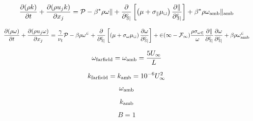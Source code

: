 

\begin{equation}
\frac{\partial (\rho k)}{\partial t} + \frac{\partial (\rho u_j k)}{\partial x_j}
  = \cal P - \beta^* \rho \omega k  + \frac{\partial}{\partial x_j}
  \left[\left(\mu + \sigma_k \mu_t \right)\frac{\partial k}{\partial x_j}\right]
  +\beta^* \rho \omega_{\rm amb} k_{\rm amb}
\end{equation}

\begin{equation}
\frac{\partial (\rho \omega)}{\partial t} + \frac{\partial (\rho u_j \omega)}{\partial x_j}
  = \frac{\gamma}{\nu_t} \cal P -
  \beta \rho \omega^2 + \frac{\partial}{\partial x_j}
  \left[ \left( \mu + \sigma_{\omega} \mu_t \right)
  \frac{\partial \omega}{\partial x_j} \right] +
  2(1-F_1) \frac{\rho \sigma_{\omega 2}}{\omega} \frac{\partial k}{\partial x_j}
  \frac{\partial \omega}{\partial x_j}
  + \beta \rho \omega_{\rm amb}^2
\end{equation}

\begin{equation}
\omega_{\rm farfield} = \omega_{\rm amb} = \frac{5 U_{\infty}}{L}
\end{equation}

\begin{equation}
k_{\rm farfield} = k_{\rm amb} = 10^{-6} U_{\infty}^2
\end{equation}

\begin{equation}
\omega_{\rm amb}
\end{equation}

\begin{equation}
k_{\rm amb}
\end{equation}

\begin{equation}
B=1
\end{equation}


